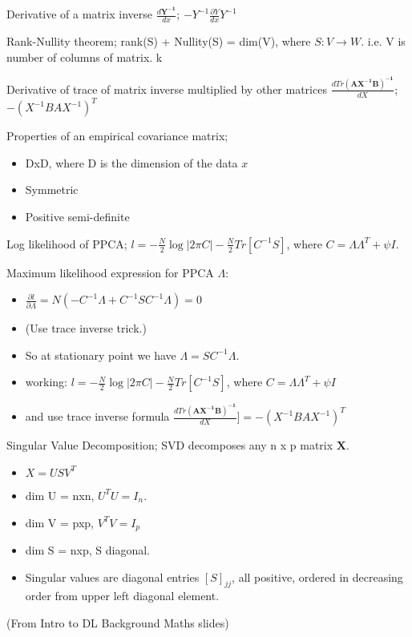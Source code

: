 \documentclass{article}
\begin{document}
Derivative of a matrix inverse $\frac{d\mathbf{Y^{-1}}}{dx}$; $-Y^{-1}\frac{\partial{Y}}{dx}Y^{-1}$

Rank-Nullity theorem; rank(S) + Nullity(S) = dim(V), where $S:V\to W$. i.e. V is number of columns of matrix. k

Derivative of trace of matrix inverse multiplied by other matrices $\frac{d Tr \mathbf{(AX^{-1}B)^{-1}}}{dX}$; $-(X^{-1}BAX^{-1})^T$

Properties of an empirical covariance matrix; \begin{itemize} \item DxD, where D is the dimension of the data $x$ \item Symmetric \item Positive semi-definite \end{itemize}

Log likelihood of PPCA; $l = -\frac{N}{2}\log|2\pi C|-\frac{N}{2}Tr[C^{-1}S]$, where $C=\Lambda\Lambda^T+\psi I$.

Maximum likelihood expression for PPCA $\Lambda$: \begin{itemize} \item $\frac{\partial l}{\partial \Lambda} = N(-C^{-1}\Lambda+C^{-1}SC^{-1}\Lambda) = 0$ \item (Use trace inverse trick.) \item So at stationary point we have $\Lambda = SC^{-1}\Lambda$.  \item working: $l = -\frac{N}{2}\log|2\pi C|-\frac{N}{2}Tr[C^{-1}S]$, where $C=\Lambda\Lambda^T+\psi I$ \item and use trace inverse formula $\frac{d Tr \mathbf{(AX^{-1}B)^{-1}}}{dX}] = -(X^{-1}BAX^{-1})^T$ \end{itemize}

Singular Value Decomposition; SVD decomposes any n x p matrix $\mathbf{X}$.\begin{itemize} \item $X = USV^T$ \item dim U = nxn, $U^TU=I_n$.  \item dim V = pxp, $V^TV=I_p$ \item dim S = nxp, S diagonal.  \item Singular values are diagonal entries $[S]_{jj}$, all positive, ordered in decreasing order from upper left diagonal element.  \end{itemize} (From Intro to DL Background Maths slides)
\end{document}
